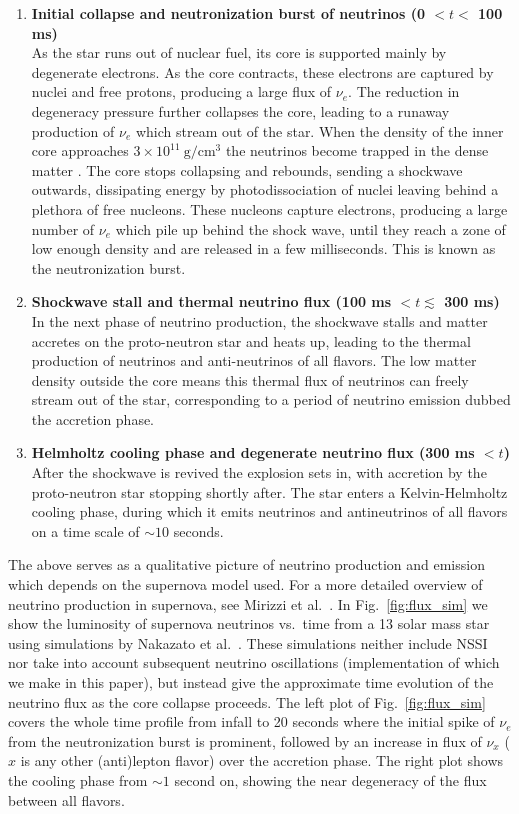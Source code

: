 \documentclass[a4paper,12pt]{article}
\newcommand\descitem[1]{\item{\bfseries #1}\\}
\begin{document}
\begin{enumerate}
\descitem {Initial collapse and neutronization burst of neutrinos (0 $< t <$ 100 ms)} As the star runs out of nuclear fuel, its core is supported mainly by degenerate electrons. As the core contracts, these electrons are captured by nuclei and free protons, producing a large flux of $\nu_{e}$. The reduction in degeneracy pressure further collapses the core, leading to a runaway production of $\nu_{e}$ which stream out of the star. When the density of the inner core approaches $3\times10^{11}\ \text{g}/\text{cm}^{3}$ the neutrinos become trapped in the dense matter \cite{Nbook}. The core stops collapsing and rebounds, sending a shockwave outwards, dissipating energy by photodissociation of nuclei leaving behind a plethora of free nucleons. These nucleons capture electrons, producing a large number of $\nu_{e}$ which pile up behind the shock wave, until they reach a zone of low enough density and are released in a few milliseconds. This is known as the neutronization burst.
\descitem{Shockwave stall and thermal neutrino flux (100 ms $< t \lesssim$ 300 ms)} In the next phase of neutrino production, the shockwave stalls and matter accretes on the proto-neutron star and heats up, leading to the thermal production of neutrinos and anti-neutrinos of all flavors. The low matter density outside the core means this thermal flux of neutrinos can freely stream out of the star, corresponding to a period of neutrino emission dubbed the accretion phase.
\descitem{Helmholtz cooling phase and degenerate neutrino flux (300 ms $< t$)} After the shockwave is revived the explosion sets in, with accretion by the proto-neutron star stopping shortly after. The star enters a Kelvin-Helmholtz cooling phase, during which it emits neutrinos and antineutrinos of all flavors on a time scale of $\sim 10$ seconds.
\end{enumerate}
The above serves as a qualitative picture of neutrino production and emission which depends on the supernova model used. For a more detailed overview of neutrino production in supernova, see Mirizzi et al.\ \cite{Mirizzi:2015eza}. In Fig.~\ref{fig:flux_sim} we show the luminosity of supernova neutrinos vs.\ time from a 13 solar mass star using simulations by Nakazato et al.\ \cite{Nakazato:2012qf}. These simulations neither include NSSI nor take into account subsequent neutrino oscillations (implementation of which we make in this paper), but instead give the approximate time evolution of the neutrino flux as the core collapse proceeds. The left plot of Fig.~\ref{fig:flux_sim} covers the whole time profile from infall to 20 seconds where the initial spike of $\nu_{e}$ from the neutronization burst is prominent, followed by an increase in flux of $\nu_{x}$ ($x$ is any other (anti)lepton flavor) over the accretion phase. The right plot shows the cooling phase from $\sim 1$ second on, showing the near degeneracy of the flux between all flavors.
\end{document}
